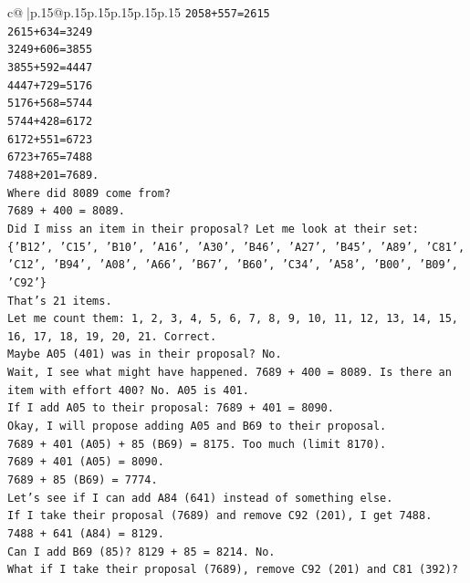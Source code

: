 \documentclass{article}
\begin{document}
{\begin{supertabular}{c@{$\;$}|p{.15\linewidth}@{}p{.15\linewidth}p{.15\linewidth}p{.15\linewidth}p{.15\linewidth}p{.15\linewidth}}
{{{\texttt{2058+557=2615} \\
\texttt{2615+634=3249} \\
\texttt{3249+606=3855} \\
\texttt{3855+592=4447} \\
\texttt{4447+729=5176} \\
\texttt{5176+568=5744} \\
\texttt{5744+428=6172} \\
\texttt{6172+551=6723} \\
\texttt{6723+765=7488} \\
\texttt{7488+201=7689.} \\
\texttt{Where did 8089 come from?} \\
\texttt{7689 + 400 = 8089.} \\
\texttt{Did I miss an item in their proposal? Let me look at their set:} \\
\texttt{\{'B12', 'C15', 'B10', 'A16', 'A30', 'B46', 'A27', 'B45', 'A89', 'C81', 'C12', 'B94', 'A08', 'A66', 'B67', 'B60', 'C34', 'A58', 'B00', 'B09', 'C92'\}} \\
\texttt{That's 21 items.} \\
\texttt{Let me count them: 1, 2, 3, 4, 5, 6, 7, 8, 9, 10, 11, 12, 13, 14, 15, 16, 17, 18, 19, 20, 21. Correct.} \\
\texttt{Maybe A05 (401) was in their proposal? No.} \\
\texttt{Wait, I see what might have happened. 7689 + 400 = 8089. Is there an item with effort 400? No. A05 is 401.} \\
\texttt{If I add A05 to their proposal: 7689 + 401 = 8090.} \\
\texttt{Okay, I will propose adding A05 and B69 to their proposal.} \\
\texttt{7689 + 401 (A05) + 85 (B69) = 8175. Too much (limit 8170).} \\
\texttt{7689 + 401 (A05) = 8090.} \\
\texttt{7689 + 85 (B69) = 7774.} \\
\texttt{Let's see if I can add A84 (641) instead of something else.} \\
\texttt{If I take their proposal (7689) and remove C92 (201), I get 7488.} \\
\texttt{7488 + 641 (A84) = 8129.} \\
\texttt{Can I add B69 (85)? 8129 + 85 = 8214. No.} \\
\texttt{What if I take their proposal (7689), remove C92 (201) and C81 (392)?} \\
}}}
\end{supertabular}}
\end{document}
